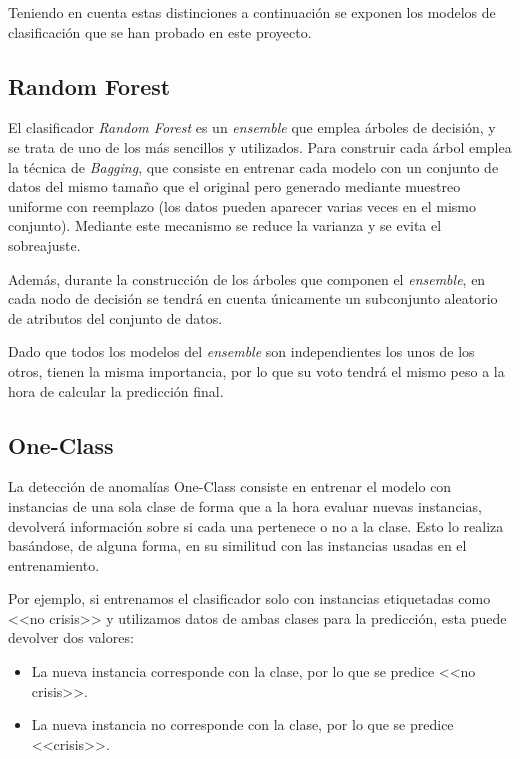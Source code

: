 Teniendo en cuenta estas distinciones a continuación se exponen los modelos de clasificación que se han probado en este proyecto.

\subsection{Random Forest}

El clasificador \textit{Random Forest} es un \textit{ensemble} que emplea  árboles de decisión, y se trata de uno de los más sencillos y utilizados. Para construir cada árbol emplea la técnica de \textit{Bagging}, que consiste en entrenar cada modelo con un conjunto de datos del mismo tamaño que el original pero generado mediante muestreo uniforme con reemplazo (los datos pueden aparecer varias veces en el mismo conjunto). Mediante este mecanismo se reduce la varianza y se evita el sobreajuste. 

Además, durante la construcción de los árboles que componen el \textit{ensemble}, en cada nodo de decisión se tendrá en cuenta únicamente un subconjunto aleatorio de atributos del conjunto de datos.

Dado que todos los modelos del \textit{ensemble} son independientes los unos de los otros, tienen la misma importancia, por lo que su voto tendrá el mismo peso a la hora de calcular la predicción final. 

\subsection{One-Class}

La detección de anomalías One-Class consiste en entrenar el modelo con instancias de una sola clase de forma que a la hora evaluar nuevas instancias, devolverá información sobre si cada una pertenece o no a la clase. Esto lo realiza basándose, de alguna forma, en su similitud con las instancias usadas en el entrenamiento. 

Por ejemplo, si entrenamos el clasificador solo con instancias etiquetadas como <<no crisis>> y utilizamos datos de ambas clases para la predicción, esta puede devolver dos valores: 

\begin{itemize}
	\item La nueva instancia corresponde con la clase, por lo que se predice <<no crisis>>. 
	\item La nueva instancia no corresponde con la clase, por lo que se predice <<crisis>>. 
\end{itemize}

